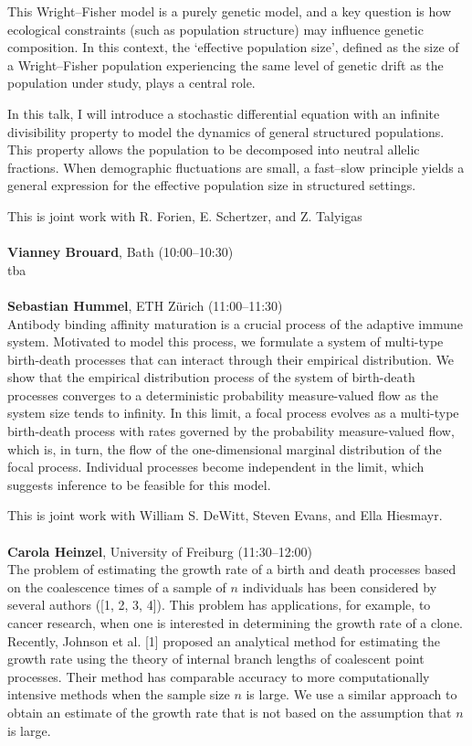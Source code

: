 \documentclass[12pt,a4paper]{article}
\begin{document}
 This Wright–Fisher model is a purely genetic model, and a key question is how ecological constraints (such as population structure) may influence genetic composition. In this context, the ‘effective population size’, defined as the size of a Wright–Fisher population experiencing the same level of genetic drift as the population under study, plays a central role. 

 In this talk, I will introduce a stochastic differential equation with an infinite divisibility property to model the dynamics of general structured populations. This property allows the population to be decomposed into neutral allelic fractions. When demographic fluctuations are small, a fast–slow principle yields a general expression for the effective population size in structured settings. 

 This is joint work with R. Forien, E. Schertzer, and Z. Talyigas \\
\\[1ex]{ \large \textbf{ Vianney Brouard}}, Bath (10:00--10:30) \\[2ex] tba \\
\\[1ex]{ \large \textbf{ Sebastian Hummel}}, ETH Zürich (11:00--11:30) \\[2ex] Antibody binding affinity maturation is a crucial process of the adaptive immune system. Motivated to model this process, we formulate a system of multi-type birth-death processes that can interact through their empirical distribution. We show that the empirical distribution process of the system of birth-death processes converges to a deterministic probability measure-valued flow as the system size tends to infinity. In this limit, a focal process evolves as a multi-type birth-death process with rates governed by the probability measure-valued flow, which is, in turn, the flow of the one-dimensional marginal distribution of the focal process. Individual processes become independent in the limit, which suggests inference to be feasible for this model. 

 This is joint work with William S. DeWitt, Steven Evans, and Ella Hiesmayr. \\
\\[1ex]{ \large \textbf{ Carola Heinzel}}, University of Freiburg (11:30--12:00) \\[2ex] The problem of estimating the growth rate of a birth and death processes based on the coalescence times of a sample of $n$ individuals has been considered by several authors ([1, 2, 3, 4]). This problem has applications, for example, to cancer research, when one is interested in determining the growth rate of a clone. Recently, Johnson et al. [1] proposed an analytical method for estimating the growth rate using the theory of internal branch lengths of coalescent point processes. Their method has comparable accuracy to more computationally intensive methods when the sample size $n$ is large. We use a similar approach to obtain an estimate of the growth rate that is not based on the assumption that $n$ is large. 
\end{document}
